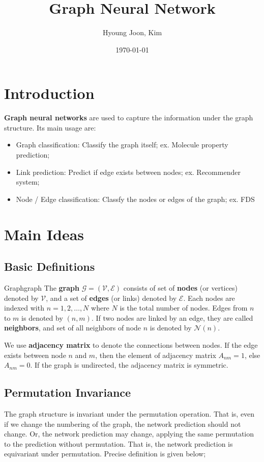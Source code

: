 \documentclass{article}
\title{Graph Neural Network}
\author{Hyoung Joon, Kim}
\date{\today}
\begin{document}
\maketitle
\tableofcontents
\newpage

\section{Introduction}
    \textbf{Graph neural networks} are used to capture the information under the graph structure.
    Its main usage are:
    \begin{itemize}
        \item Graph classification: Classify the graph itself; ex. Molecule property prediction;
        \item Link prediction: Predict if edge exists between nodes; ex. Recommender system;
        \item Node / Edge classification: Classfy the nodes or edges of the graph; ex. FDS
    \end{itemize}

\section{Main Ideas}
    \subsection{Basic Definitions}
        \begin{defn}{Graph}{graph}
            The \textbf{graph} $\mathcal G=(\mathcal V, \mathcal E)$ consists of set of \textbf{nodes} (or vertices) denoted by
            $\mathcal V$, and a set of \textbf{edges} (or links) denoted by $\mathcal E$. Each nodes are
            indexed with $n=1,2,\dots,N$ where $N$ is the total number of nodes. Edges from $n$ to $m$ is denoted by
            $(n,m)$. If two nodes are linked by an edge, they are called \textbf{neighbors}, and set of all neighbors
            of node $n$ is denoted by $\mathcal N(n)$. 
        \end{defn}

        We use \textbf{adjacency matrix} to denote the connections between nodes. If the edge exists
        between node $n$ and $m$, then the element of adjacency matrix $A_{nm}=1$, else $A_{nm}=0$.
        If the graph is undirected, the adjacency matrix is symmetric.
    
    \subsection{Permutation Invariance}
        The graph structure is invariant under the permutation operation. That is, even if we change the
        numbering of the graph, the network prediction should not change. Or, the network prediction may change,
        applying the same permutation to the prediction without permutation. That is, the network prediction is
        equivariant under permutation. Precise definition is given below;
        
\end{document}
